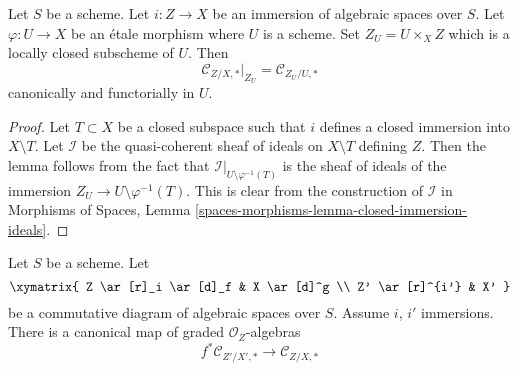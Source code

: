 \begin{lemma}
\label{lemma-etale-conormal-algebra}
Let $S$ be a scheme. Let $i : Z \to X$ be an immersion of algebraic spaces
over $S$. Let $\varphi : U \to X$ be an \'etale morphism where $U$ is a
scheme. Set $Z_U = U \times_X Z$ which is a locally closed subscheme of $U$.
Then
$$
\mathcal{C}_{Z/X, *}|_{Z_U} = \mathcal{C}_{Z_U/U, *}
$$
canonically and functorially in $U$.
\end{lemma}

\begin{proof}
Let $T \subset X$ be a closed subspace such that $i$ defines a closed
immersion into $X \setminus T$. Let $\mathcal{I}$ be the quasi-coherent
sheaf of ideals on $X \setminus T$ defining $Z$. Then the lemma follows
from the fact that
$\mathcal{I}|_{U \setminus \varphi^{-1}(T)}$ is the sheaf of ideals of
the immersion $Z_U \to U \setminus \varphi^{-1}(T)$.
This is clear from the construction of $\mathcal{I}$ in
Morphisms of Spaces, Lemma
\ref{spaces-morphisms-lemma-closed-immersion-ideals}.
\end{proof}

\begin{lemma}
\label{lemma-conormal-algebra-functorial}
Let $S$ be a scheme. Let
$$
\xymatrix{
Z \ar[r]_i \ar[d]_f & X \ar[d]^g \\
Z' \ar[r]^{i'} & X'
}
$$
be a commutative diagram of algebraic spaces over $S$.
Assume $i$, $i'$ immersions. There is a canonical map
of graded $\mathcal{O}_Z$-algebras
$$
f^*\mathcal{C}_{Z'/X', *}
\longrightarrow
\mathcal{C}_{Z/X, *}
$$
\end{lemma}

